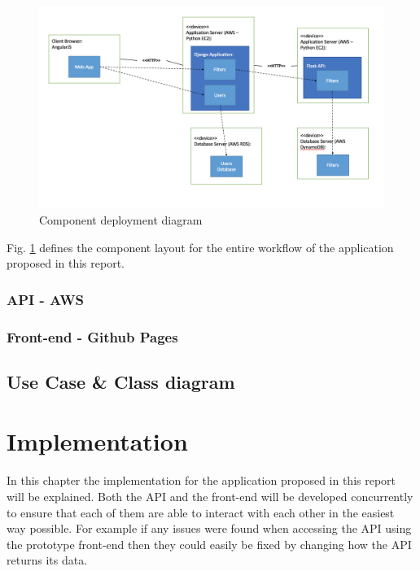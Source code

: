 \documentclass[a4paper,12pt]{report}
\begin{document}
    \begin{figure}[ht]
      \centering
      \includegraphics[width=\linewidth]{deployment-diagram}
      \caption{Component deployment diagram}
      \label{fig:deployment-diagram}
    \end{figure}

    Fig. \ref{fig:deployment-diagram} defines the component layout for the entire workflow of the application proposed in this report.

    \subsection{API - AWS}

    \subsection{Front-end - Github Pages}

  \section{Use Case \& Class diagram}

\chapter{Implementation} \label{cha:implement}
  In this chapter the implementation for the application proposed in this report will be explained. Both the API and the front-end will be developed concurrently to ensure that each of them are able to interact with each other in the easiest way possible. For example if any issues were found when accessing the API using the prototype front-end then they could easily be fixed by changing how the API returns its data.
\end{document}

